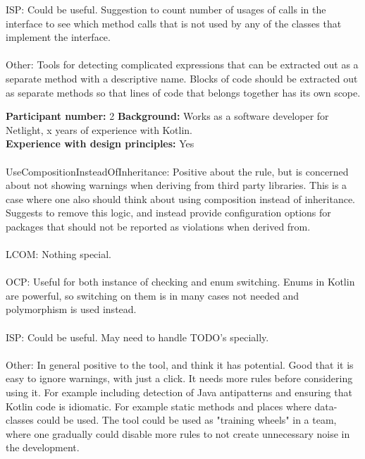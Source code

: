 \noindent ISP: Could be useful. Suggestion to count number of usages of calls in the interface to see which method calls that is not used by any of the classes that implement the interface. \\\\

\noindent Other: Tools for detecting complicated expressions that can be extracted out as a separate method with a descriptive name. Blocks of code should be extracted out as separate methods so that lines of code that belongs together has its own scope. 
\clearpage


\noindent\textbf{Participant number:} 2 \newline
\textbf{Background:} Works as a software developer for Netlight, x years of experience with Kotlin.\\
\textbf{Experience with design principles:} Yes \\\\

\noindent UseCompositionInsteadOfInheritance: Positive about the rule, but is concerned about not showing warnings when deriving from third party libraries. This is a case where one also should think about using composition instead of inheritance. Suggests to remove this logic, and instead provide configuration options for packages that should not be reported as violations when derived from.  \\\\

\noindent LCOM: Nothing special. \\\\

\noindent OCP: Useful for both instance of checking and enum switching. Enums in Kotlin are powerful, so switching on them is in many cases not needed and polymorphism is used instead.\\\\

\noindent ISP: Could be useful. May need to handle TODO's specially. \\\\

\noindent Other: In general positive to the tool, and think it has potential. Good that it is easy to ignore warnings, with just a click. It needs more rules before considering using it. For example including detection of Java antipatterns and ensuring that Kotlin code is idiomatic. For example static methods and places where data-classes could be used. The tool could be used as "training wheels" in a team, where one gradually could disable more rules to not create unnecessary noise in the development.
\clearpage

